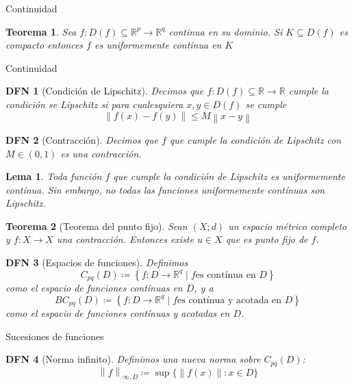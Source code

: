 \documentclass[a4paper]{article}\usepackage{/home/alonso/Documents/Projects/formularios/styles}
\newtheorem{definition}{DFN}
\theoremstyle{mytheoremstyle}
\newtheorem{theorem}{Teorema}
\newtheorem{lemma}{Lema}
\newcommand{\R}{\mathbb{R}}
\newcommand{\1}{\mathds{1}}
\newcommand{\norm}[1]{\left\|#1\right\|}
\begin{document}
\begin{multicols*}{3}
\begin{roundbox}{Continuidad}
\begin{theorem}
Sea $f:D(f)\subseteq\R^{p}\to\R^{q}$ continua en su dominio. Si $K\subseteq D(f)$ es compacto entonces $f$ es uniformemente continua en $K$
\end{theorem}
\end{roundbox}


\begin{roundbox}{Continuidad}
\begin{definition}[Condición de Lipschitz]
    Decimos que $f: D(f) \subseteq \R \to \R$ cumple la condición se Lipschitz si para cualesquiera $x, y \in D(f)$ se cumple
    \[
        \norm{f(x) - f(y)} \leq M \norm{x - y}
    \]
\end{definition}

\begin{definition}[Contracción]
    Decimos que $f$ que cumple la condición de Lipschitz con $M \in (0,1)$ es una contracción.
\end{definition}

\begin{lemma}
    Toda función $f$ que cumple la condición de Lipschitz es uniformemente contínua.
    Sin embargo, no todas las funciones uniformemente contínuas son Lipschitz.
\end{lemma}

\begin{theorem}[Teorema del punto fijo]
Sean $(X;d)$ un espacio métrico completo y $f:X\to X$ una contracción. Entonces existe $u\in X$ que es punto fijo de $f$.
\end{theorem}

\begin{definition}[Espacios de funciones]
    Definimos
    \[
        C_{pq}(D) \coloneqq \left\{ f:D \to \R^{q} \mid f \text{es contínua en } D \right\}
    \]
    como el espacio de funciones contínuas en $D$, y a
    \[
        BC_{pq}(D) \coloneqq \left\{ f:D \to \R^{q} \mid f \text{es contínua y acotada en } D \right\}
    \]
    como el espacio de funciones contínuas \underline{y} acotadas en $D$.
\end{definition}
\end{roundbox}

\begin{roundbox}{Sucesiones de funciones}
\begin{definition}[Norma infinito]
    Definimos una nueva norma sobre $C_{pq}(D)$:
    \[
    \norm{f}_{\infty,D} \coloneqq \sup\big\{\|f(x)\|:x\in D\big\}
    \]
\end{definition}


\end{roundbox}
\end{multicols*}
\end{document}
